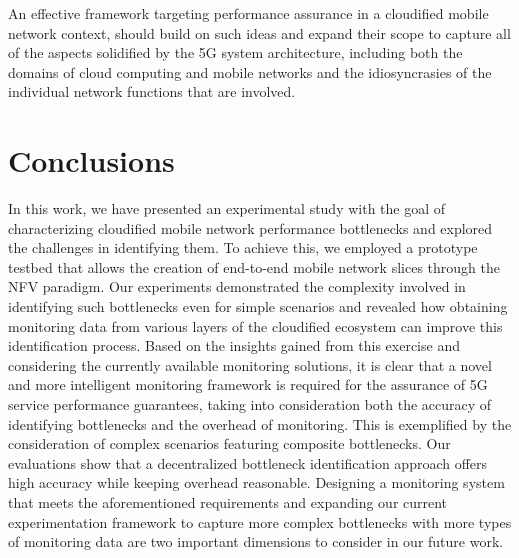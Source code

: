 \documentclass[journal,comsoc]{IEEEtran}
\begin{document}
%
An effective framework targeting performance assurance in a cloudified mobile network context, should build on such ideas and expand their scope to capture all of the aspects solidified by the 5G system architecture, including both the domains of cloud computing and mobile networks and the idiosyncrasies of the individual network functions that are involved.


\section{Conclusions}
\label{sec:conclusions}

% 
In this work, we have presented an experimental study with the goal of characterizing cloudified mobile network performance bottlenecks and explored the challenges in identifying them. 
To achieve this, we employed a prototype testbed that allows the creation of end-to-end mobile network slices through the NFV paradigm. 
Our experiments demonstrated the complexity involved in identifying such bottlenecks even for simple scenarios and revealed how obtaining monitoring data from various layers of the cloudified ecosystem can improve this identification process. 
Based on the insights gained from this exercise and considering the currently available monitoring solutions, it is clear that a novel and more intelligent monitoring framework is required for the assurance of 5G service performance guarantees, taking into consideration both the accuracy of identifying bottlenecks and the overhead of monitoring.
This is exemplified by the consideration of complex scenarios featuring composite bottlenecks.
Our evaluations show that a decentralized bottleneck identification approach offers high accuracy while keeping overhead reasonable.    
Designing a monitoring system that meets the aforementioned requirements and expanding our current experimentation framework to capture more complex bottlenecks with more types of monitoring data are two important dimensions to consider in our future work.

%



%
\end{document}

